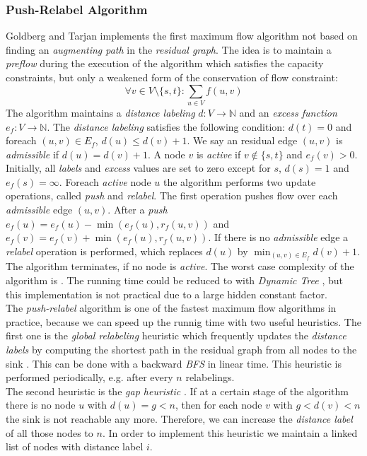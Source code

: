 \subsubsection{Push-Relabel Algorithm}
\label{sec:push_relabel}

Goldberg and Tarjan \cite{goldberg1988new} implements the first maximum flow algorithm
not based on finding an \emph{augmenting path} in the \emph{residual graph}. The idea is
to maintain a \emph{preflow} during the execution of the algorithm which satisfies the capacity 
constraints, but only a weakened form of the conservation of flow constraint:
\[\forall v \in V \setminus \{s,t\}: \sum_{u \in V} f(u,v)\]
The algorithm maintains a \emph{distance labeling} $d: V \rightarrow \mathbb{N}$ and an 
\emph{excess function} $e_f: V \rightarrow \mathbb{N}$. The \emph{distance labeling} satisfies
the following condition: $d(t) = 0$ and foreach $(u,v) \in E_f$, $d(u) \le d(v) + 1$. We say an
residual edge $(u,v)$ is \emph{admissible} if $d(u) = d(v) + 1$. A node $v$ is \emph{active}
if $v \notin \{s,t\}$ and $e_f(v) > 0$.\\
Initially, all \emph{labels} and \emph{excess} values are set to zero except for $s$, $d(s) = 1$
and $e_f(s) = \infty$. Foreach \emph{active} node $u$ the algorithm performs two update
operations, called \emph{push} and \emph{relabel}. The first operation pushes flow
over each \emph{admissible} edge $(u,v)$. After a \emph{push} $e_f(u) = e_f(u) - 
\min{(e_f(u),r_f(u,v))}$ and $e_f(v) = e_f(v) + \min{(e_f(u),r_f(u,v))}$. If there is no
\emph{admissible} edge a \emph{relabel} operation is performed, which replaces $d(u)$ by
$\min_{(u,v) \in E_f} d(v) + 1$. The algorithm terminates, if no node is \emph{active}.
The worst case complexity of the algorithm is . The running time could be reduced
to  with \emph{Dynamic Tree} \cite{goldberg1988new, sleator1981data}, but this
implementation is not practical due to a large hidden constant factor.\\
The \emph{push-relabel} algorithm is one of the fastest maximum flow algorithms in practice,
because we can speed up the runnig time with two useful heuristics. The first one is
the \emph{global relabeling} heuristic which frequently updates the \emph{distance labels} by computing
the shortest path in the residual graph from all nodes to the sink \cite{cherkassky1997implementing}.
This can be done with a backward \emph{BFS} in linear time. This heuristic is performed periodically,
e.g. after every $n$ relabelings. \\
The second heuristic is the \emph{gap heuristic} \cite{cherkassky1994fast,derigs1989implementing}.
If at a certain stage of the algorithm there is no node $u$ with $d(u) = g < n$, then for each node
$v$ with $g < d(v) < n$ the sink is not reachable any more. Therefore, we can increase the \emph{distance
label} of all those nodes to $n$. In order to implement this heuristic we maintain a linked list of
nodes with distance label $i$.

